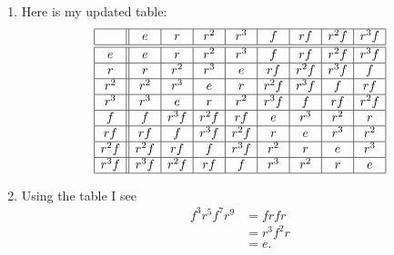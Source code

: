 \documentclass[noauthor,nooutcomes,hints,handout]{ximera}
\begin{document}
\begin{question}
\begin{enumerate}
  \end{enumerate}
  \begin{freeResponse}
    \begin{enumerate}
      \item Here is my updated table:
  \[
  \begin{array}{|c||c|c|c|c|c|c|c|c|}
    \hline
         & e    & r     & r^2     & r^3      & f      & rf     & r^2f      &  r^3 f\\ \hline\hline
    e    & e    & r     & r^2     & r^3      & f      & rf     & r^2f      &  r^3 f\\ \hline
    r    & r    & r^2   & r^3     & e        & rf     & r^2f   & r^3f      & f\\ \hline
    r^2  & r^2  & r^3   & e       & r        & r^2f   & r^3f   &    f      & r  f\\ \hline
    r^3  & r^3  & e     & r       & r^2      & r^3f   &    f   & r  f      & r^2f\\ \hline
    f    & f    & r^3f  & r^2f    & rf       & e      & r^3    & r^2       & r    \\ \hline
    rf   & rf   &  f    & r^3f    & r^2f     & r      & e      & r^3       & r^2   \\ \hline
    r^2f & r^2f & r f   & f       & r^3f     & r^2    & r      & e         & r^3     \\ \hline
    r^3f & r^3f & r^2f  & rf      & f        & r^3    & r^2    & r         & e       \\ \hline
  \end{array}
  \]
\item Using the table I see
  \begin{align*}
    f^3r^5f^7r^9 &= frfr\\
    &= r^3f^2r\\
    &= e.
  \end{align*}
    \end{enumerate}
  \end{freeResponse}
\end{question}
\end{document}

